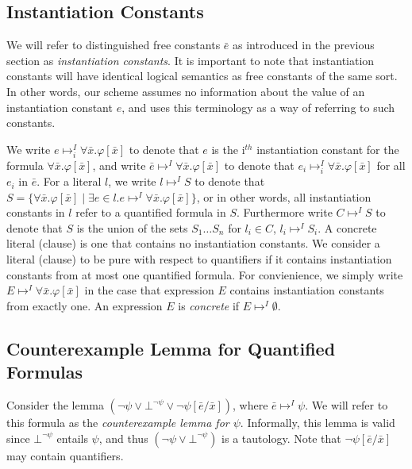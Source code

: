 \documentclass{llncs}
\begin{document}
\subsection{Instantiation Constants}

We will refer to distinguished free constants $\bar{e}$ as introduced in the previous section as \emph{instantiation constants}.
It is important to note that instantiation constants will have identical logical semantics as free constants of the same sort.
In other words, our scheme assumes no information about the value of an instantiation constant $e$, and uses this terminology as a way of referring to such constants.

We write $e \mapsto^I_i \forall \bar{x}. \varphi[ \bar{x} ]$ to denote that $e$ is the i$^{th}$ instantiation constant for the formula $\forall \bar{x}. \varphi[ \bar{x} ] $, and write $\bar{e} \mapsto^I \forall \bar{x}. \varphi[ \bar{x} ]$ to denote that $e_i \mapsto^I_i \forall \bar{x}. \varphi[ \bar{x} ]$ for all $e_i$ in $\bar{e}$.
For a literal $l$, we write $l \mapsto^I S$ to denote that $S = \{ \forall \bar{x}. \varphi[ \bar{x} ] \mid \exists e \in l. e \mapsto^I \forall \bar{x}. \varphi[ \bar{x} ] \}$, or in other words, all instantiation constants in $l$ refer to a quantified formula in $S$.
Furthermore write $C \mapsto^I S$ to denote that $S$ is the union of the sets $S_1 \ldots S_n$ for $l_i \in C$, $l_i \mapsto^I S_i$.
A concrete literal (clause) is one that contains no instantiation constants.
We consider a literal (clause) to be pure with respect to quantifiers if it contains instantiation constants from at most one quantified formula.
For convienience, we simply write $E \mapsto^I \forall \bar{x}. \varphi[ \bar{x} ]$ in the case that expression $E$ contains instantiation constants from exactly one.
An expression $E$ is \emph{concrete} if $E \mapsto^I \emptyset$.

\subsection{Counterexample Lemma for Quantified Formulas}

Consider the lemma $( \neg \psi \vee \bot^{\neg \psi} \vee \neg \psi[\bar{e}/\bar{x}])$, where $\bar{e} \mapsto^I \psi$.
We will refer to this formula as the \emph{counterexample lemma for $\psi$}.
Informally, this lemma is valid since $\bot^{\neg \psi}$ entails $\psi$, and thus $( \neg \psi \vee \bot^{\neg \psi} )$ is a tautology.
Note that $\neg \psi[\bar{e}/\bar{x}]$ may contain quantifiers.
\end{document}
